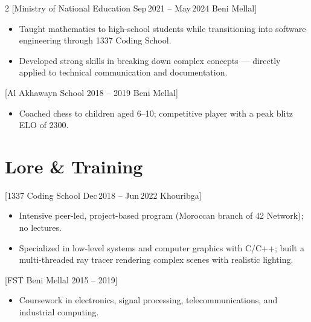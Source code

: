 \documentclass[10pt,a4paper,twoside,openany,nodeprecatedcode]{dndbook}
\begin{document}
\begin{multicols}{2}
[Ministry of National Education \textbar{} Sep\,2021 -- May\,2024 \textbar{} Beni Mellal]
\begin{itemize}
  \item Taught mathematics to high-school students while transitioning into software engineering
        through 1337 Coding School.
  \item Developed strong skills in breaking down complex concepts --- directly applied to
        technical communication and documentation.
\end{itemize}

[Al Akhawayn School \textbar{} 2018 -- 2019 \textbar{} Beni Mellal]
\begin{itemize}
  \item Coached chess to children aged 6--10; competitive player with a peak blitz ELO of 2300.
\end{itemize}

\section{Lore \& Training}

[1337 Coding School \textbar{} Dec\,2018 -- Jun\,2022 \textbar{} Khouribga]
\begin{itemize}
  \item Intensive peer-led, project-based program (Moroccan branch of 42 Network); no lectures.
  \item Specialized in low-level systems and computer graphics with C/C++; built a multi-threaded
        ray tracer rendering complex scenes with realistic lighting.
\end{itemize}

[FST Beni Mellal \textbar{} 2015 -- 2019]
\begin{itemize}
  \item Coursework in electronics, signal processing, telecommunications, and industrial computing.
\end{itemize}

\end{multicols}
\end{document}
